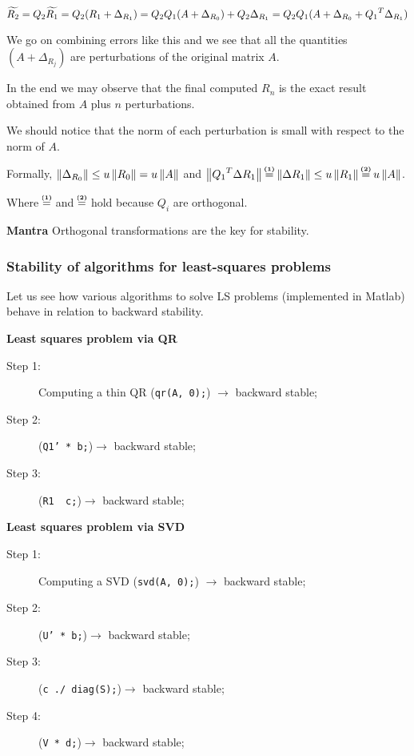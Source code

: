 \documentclass[ComputationalMathematics.tex]{subfiles}
\begin{document}
\[
  \widetilde{R_2} = Q_2 \widetilde{R_1} = Q_2 (R_1 + \Delta_{R_1}) = Q_2 Q_1 (A + \Delta_{R_0}) + Q_2 \Delta_{R_1} = Q_2 Q_1 (A + \Delta_{R_0} + {Q_1}^{T} \Delta_{R_1})
\]

We go on combining errors like this and we see that all the quantities $(A + \Delta_{R_j})$ are perturbations of the original matrix $A$.

In the end we may observe that the final computed $R_n$ is the exact result obtained from $A$ plus $n$ perturbations.

\begin{obs}
  We should notice that the norm of each perturbation is small with respect to the norm of $A$.
  
  Formally, $\left\lVert\Delta_{R_0}\right\rVert \le u \left\lVert R_0\right\rVert = u \left\lVert A\right\rVert$ and $\norm{\tr{Q_1} \Delta R_1} \numeq{(1)} \norm{\Delta R_1} \le u \norm{R_1} \numeq{(2)} u \norm{A}$.

  Where $\numeq{(1)}$ and $\numeq{(2)}$ hold because $Q_i$ are orthogonal. 
\end{obs}

\begin{myframe}{{\large {}} \textbf{Mantra}}
Orthogonal transformations are the key for stability. 
\end{myframe}

\subsubsection{Stability of algorithms for least-squares problems}
Let us see how various algorithms to solve LS problems (implemented in Matlab) behave in relation to backward stability.

\textbf{Least squares problem via QR}
\begin{description}
  \item[{\sc Step 1:}] Computing a thin QR (\texttt{qr(A, 0);}) $\rightarrow$ backward stable;
  \item[{\sc Step 2:}] (\texttt{Q1' * b;})$\rightarrow$ backward stable;
  \item[{\sc Step 3:}] (\texttt{R1 \ c;})$\rightarrow$ backward stable;
\end{description}


\textbf{Least squares problem via SVD}
\begin{description}
  \item[{\sc Step 1:}] Computing a SVD (\texttt{svd(A, 0);}) $\rightarrow$ backward stable;
  \item[{\sc Step 2:}] (\texttt{U' * b;})$\rightarrow$ backward stable;
  \item[{\sc Step 3:}] (\texttt{c ./ diag(S);})$\rightarrow$ backward stable;
  \item[{\sc Step 4:}] (\texttt{V * d;})$\rightarrow$ backward stable; 
\end{description}
\end{document}
